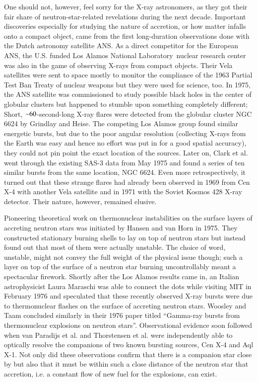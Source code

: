 One should not, however, feel sorry for the X-ray astronomers, as they got their fair share of neutron-star-related revelations during the next decade.
Important discoveries especially for studying the nature of accretion, or how matter infalls onto a compact object, came from the first long-duration observations done with the Dutch astronomy satellite ANS.
As a direct competitor for the European ANS, the U.S. funded Los Alamos National Laboratory nuclear research center was also in the game of observing X-rays from compact objects.
Their Vela satellites were sent to space mostly to monitor the compliance of the 1963 Partial Test Ban Treaty of nuclear weapons but they were used for science, too.
In 1975, the ANS satellite was commissioned to study possible black holes in the center of globular clusters but happened to stumble upon something completely different;
Short, $\mathord{\sim} 60$-second-long X-ray flares were detected from the globular cluster NGC 6624 by Grindlay and Heise.\cite{GGS76}
The competing Los Alamos group found similar energetic bursts, but due to the poor angular resolution (collecting X-rays from the Earth was easy and hence no effort was put in for a good spatial accuracy), they could not pin point the exact location of the sources.\cite{BCE76}
Later on, Clark et al. went through the existing SAS-3 data from May 1975 and found a series of ten similar bursts from the same location, NGC 6624.\cite{CJB76}
Even more retrospectively, it turned out that these strange flares had already been observed in 1969 from Cen X-4\cite{BCE72} with another Vela satellite and in 1971 with the Soviet Kosmos 428 X-ray detector\cite{BKM75}.
Their nature, however, remained elusive.

Pioneering theoretical work on thermonuclear instabilities on the surface layers of accreting neutron stars was initiated by Hansen and van Horn in 1975.\cite{HvH75}
They constructed stationary burning shells to lay on top of neutron stars but instead found out that most of them were actually unstable.
The choice of word, unstable, might not convey the full weight of the physical issue though;
such a layer on top of the surface of a neutron star burning uncontrollably meant a spectacular firework.
Shortly after the Los Alamos results came in, an Italian astrophysicist Laura Maraschi was able to connect the dots while visiting MIT in February 1976 and speculated that these recently observed X-ray bursts were due to thermonuclear flashes on the surface of accreting neutron stars.\cite{MC77, Lewin93}
Woosley and Taam concluded similarly in their 1976 paper titled ``Gamma-ray bursts from thermonuclear explosions on neutron stars''.\cite{WT76}
Observational evidence soon followed when van Paradijs et al. and Thorstensen et al. were independently able to optically resolve the companions of two known bursting sources, Cen X-4\cite{vPV80} and Aql X-1\cite{TCB78}.
Not only did these observations confirm that there is a companion star close by but also that it must be within such a close distance of the neutron star that accretion, i.e. a constant flow of new fuel for the explosions, can exist.

